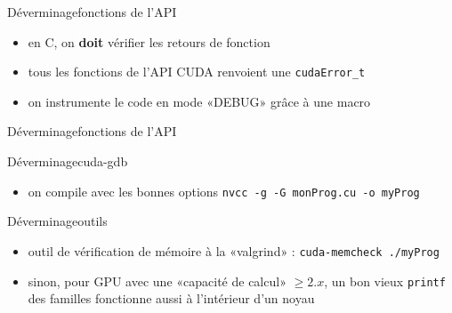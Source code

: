 \documentclass[11pt,mathserif]{beamer}
\newcommand{\scout}{\faAngellist}
\newcommand{\argi}{\faLightbulbO}
\newcommand{\adibi}{\faCommentO}
\newcommand{\harritu}{\faExclamation}
\begin{document}
\begin{frame}{Déverminage}{fonctions de l'API}
  \begin{itemize}[<+->]
    \item[\adibi] en C, on {\bf doit} vérifier les retours de fonction 
\begin{center}
  
\end{center}
    \item[\argi] tous les fonctions de l'API CUDA renvoient une \texttt{cudaError\_t}
    \item[\scout] on instrumente le code en mode «DEBUG» grâce à une macro
\begin{center}
  
\end{center}
  \end{itemize}
\end{frame}

\begin{frame}{Déverminage}{fonctions de l'API}
\begin{center}
  
\end{center}
\end{frame}

\begin{frame}{Déverminage}{cuda-gdb}
  \begin{itemize}[<+->]
        \item on compile avec les bonnes options \texttt{nvcc -g -G monProg.cu -o myProg}
   \end{itemize}
\pause
  
\end{frame}

\begin{frame}{Déverminage}{outils}
  \begin{itemize}[<+->]
    \item outil de vérification de mémoire à la «valgrind» : \texttt{cuda-memcheck ./myProg}
    \item[\scout] sinon, pour GPU avec une «capacité de calcul» $\geqslant 2.x$, un bon vieux \texttt{printf} des familles fonctionne aussi
    à l'intérieur d'un noyau \harritu
  \end{itemize} 
\end{frame}
\end{document}
